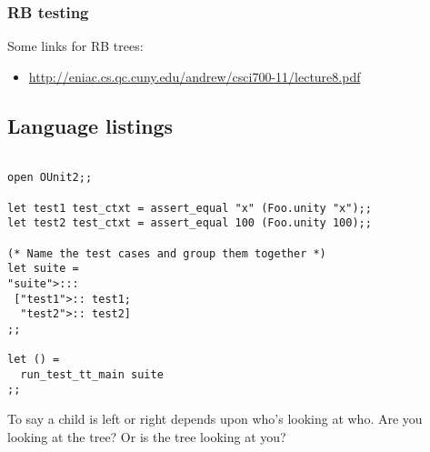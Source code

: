\documentclass{article}
\begin{document}
\subsubsection{RB testing}

Some links for RB trees:

\begin{itemize}
\item \href{http://eniac.cs.qc.cuny.edu/andrew/csci700-11/lecture8.pdf}{%
http://eniac.cs.qc.cuny.edu/andrew/csci700-11/lecture8.pdf}
\end{itemize}

\subsection{Language listings}

\begin{lstlisting}[frame=single]  % Start your code-block

open OUnit2;;

let test1 test_ctxt = assert_equal "x" (Foo.unity "x");;
let test2 test_ctxt = assert_equal 100 (Foo.unity 100);;

(* Name the test cases and group them together *)
let suite =
"suite">:::
 ["test1">:: test1;
  "test2">:: test2]
;;

let () =
  run_test_tt_main suite
;;
\end{lstlisting}

To say a child is left or right depends upon who's looking at who.
Are you looking at the tree? Or is the tree looking at you?
\end{document}

